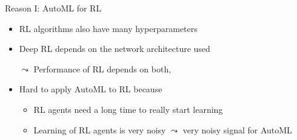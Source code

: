 \documentclass[aspectratio=169]{../latex_main/tntbeamer}  %
\begin{document}
\begin{frame}[c]{Reason I: AutoML for RL}
	
	\begin{itemize}
		\item RL algorithms also have many hyperparameters 
		\item Deep RL depends on the network architecture used 
		\item[$\leadsto$] Performance of RL depends on both\newline {}, 
		\pause
		\bigskip
		\item Hard to apply AutoML to RL because
		\begin{itemize}
			\item RL agents need a long time to really start learning 
			\item Learning of RL agents is very noisy $\leadsto$ very noisy signal for AutoML
		\end{itemize}
	\end{itemize}
	
\end{frame}
\end{document}
